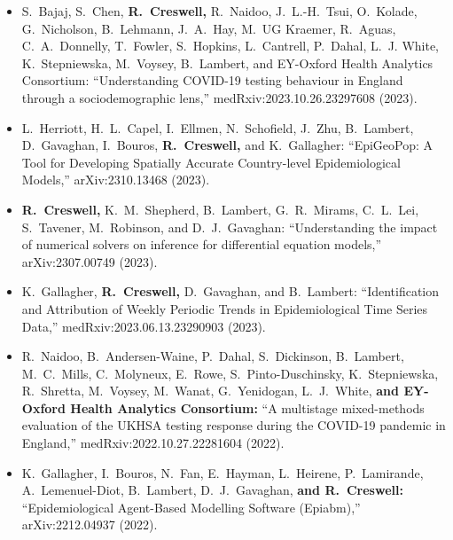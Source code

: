 \documentclass[10pt]{article}
\begin{document}
\begin{itemize}[leftmargin=*]
\setlength{\itemsep}{4pt}
\setlength{\parskip}{0pt}
\setlength{\parsep}{0pt}
\vspace{-.5cm}

\item {\color{gray}S.\ Bajaj,\textsuperscript{\dag} S.\ Chen,\textsuperscript{\dag}} \textbf{R.\ Creswell,\textsuperscript{\dag}} {\color{gray}R.\ Naidoo,\textsuperscript{\dag} J.\ L.-H.\ Tsui,\textsuperscript{\dag} O.\ Kolade, G.\ Nicholson, B.\ Lehmann, J.\ A.\ Hay, M.\ UG Kraemer, R.\ Aguas, C.\ A.\ Donnelly, T.\ Fowler, S.\ Hopkins, L.\ Cantrell, P.\ Dahal, L.\ J. White, K.\ Stepniewska, M.\ Voysey, B.\ Lambert, and EY-Oxford Health Analytics Consortium:} ``Understanding COVID-19 testing behaviour in England through a sociodemographic lens,'' medRxiv:2023.10.26.23297608 (2023).

\item {\color{gray}L.\ Herriott,\textsuperscript{\dag} H.\ L.\ Capel,\textsuperscript{\dag} I.\ Ellmen,\textsuperscript{\dag} N.\ Schofield,\textsuperscript{\dag} J.\ Zhu,\textsuperscript{\dag} B.\ Lambert, D.\ Gavaghan, I.\ Bouros,} \textbf{R.\ Creswell,} {\color{gray}and K.\ Gallagher:} ``EpiGeoPop: A Tool for Developing Spatially Accurate Country-level Epidemiological Models,'' arXiv:2310.13468 (2023).

\item \textbf{R.\ Creswell,} {\color{gray}K.\ M.\ Shepherd, B.\ Lambert, G.\ R.\ Mirams, C.\ L.\ Lei, S.\ Tavener, M.\ Robinson, and D.\ J.\ Gavaghan:} ``Understanding the impact of numerical solvers on inference for differential equation models,'' arXiv:2307.00749 (2023).  

\item {\color{gray}K.\ Gallagher,} \textbf{R.\ Creswell,} {\color{gray} D.\ Gavaghan, and B.\ Lambert:} ``Identification and Attribution of Weekly Periodic Trends in Epidemiological Time Series Data,'' medRxiv:2023.06.13.23290903 (2023).


\item {\color{gray}R.\ Naidoo, B.\ Andersen-Waine, P.\ Dahal, S.\ Dickinson, B.\ Lambert, M.\ C.\ Mills,  C.\ Molyneux, E.\ Rowe, S.\ Pinto-Duschinsky, K.\ Stepniewska, R.\ Shretta, M.\ Voysey, M.\ Wanat, G.\ Yenidogan, L.\ J.\ White,} \textbf{and EY-Oxford Health Analytics Consortium:} ``A multistage mixed-methods evaluation of the UKHSA testing response during the COVID-19 pandemic in England,'' medRxiv:2022.10.27.22281604 (2022).


\item {\color{gray}K.\ Gallagher,\textsuperscript{\dag} I.\ Bouros,\textsuperscript{\dag} N.\ Fan,\textsuperscript{\dag} E.\ Hayman,\textsuperscript{\dag} L.\ Heirene,\textsuperscript{\dag} P.\ Lamirande,\textsuperscript{\dag} A.\ Lemenuel-Diot, B.\ Lambert, D.\ J.\ Gavaghan,} \textbf{and R.\ Creswell:} ``Epidemiological Agent-Based Modelling Software (Epiabm),'' arXiv:2212.04937 (2022).



\end{itemize}
\end{document}
